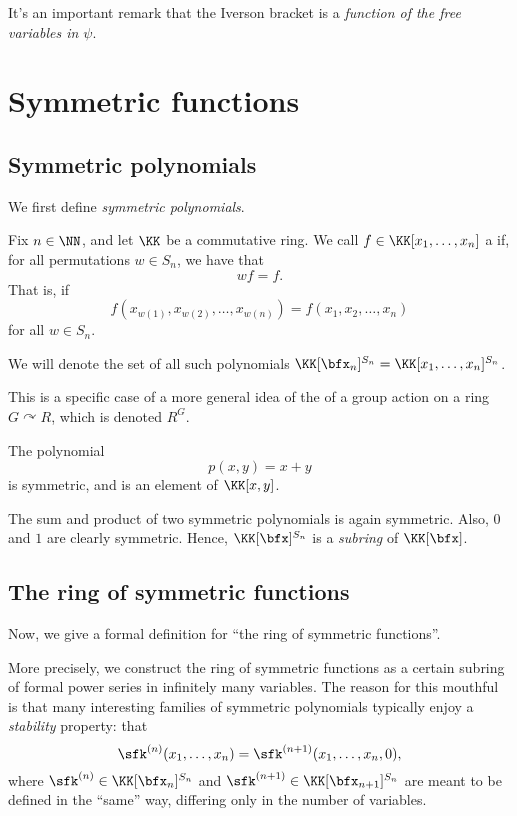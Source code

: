 \documentclass{article}
\newcommand{\pring}[2]{#1 [ {#2} ]}
\begin{document}
It's an important remark that the Iverson bracket is a \textit{function of the free variables in $\psi$}.

\section{Symmetric functions}

\subsection{Symmetric polynomials}

We first define \textit{symmetric polynomials}.

\begin{definition}
    Fix $n \in \NN$, and let $\KK$ be a commutative ring.
    We call $f \in \pring{\KK}{x_1,\ldots,x_n}$ a  if, for all permutations $w \in S_n$, we have that
    \[
        wf = f.
    \]
    That is, if
    \[
        f(x_{w(1)},x_{w(2)},\ldots,x_{w(n)})
        =
        f(x_1,x_2,\ldots,x_n)
    \]
    for all $w \in S_n$.

    We will denote the set of all such polynomials $\pring{\KK}{\bfx_n}^{S_n} = \pring{\KK}{x_1,\ldots,x_n}^{S_n}$.
\end{definition}

This is a specific case of a more general idea of the  of a group action on a ring $G \curvearrowright R$, which is denoted $R^G$.

\begin{example}
    The polynomial
    \[
        p(x,y)
        =
        x + y 
    \]
    is symmetric, and is an element of $\pring{\KK}{x,y}$.
\end{example}

\begin{remark}
    The sum and product of two symmetric polynomials is again symmetric.
    Also, $0$ and $1$ are clearly symmetric.
    Hence, $\pring{\KK}{\bfx}^{S_n}$ is a \textit{subring} of $\pring{\KK}{\bfx}$.
\end{remark}


\subsection{The ring of symmetric functions}

Now, we give a formal definition for ``the ring of symmetric functions''.

More precisely, we construct the ring of symmetric functions as a certain subring of formal power series in infinitely many variables.
The reason for this mouthful is that many interesting families of symmetric polynomials typically enjoy a \textit{stability} property: that
\[
    \sfk^{(n)}(x_1,\ldots,x_n)
    =
    \sfk^{(n+1)}(x_1,\ldots,x_n, 0),
\]
where $\sfk^{(n)} \in \pring{\KK}{\bfx_n}^{S_n}$ and $\sfk^{(n+1)} \in \pring{\KK}{\bfx_{n+1}}^{S_n}$ are meant to be defined in the ``same'' way, differing only in the number of variables.
\end{document}
